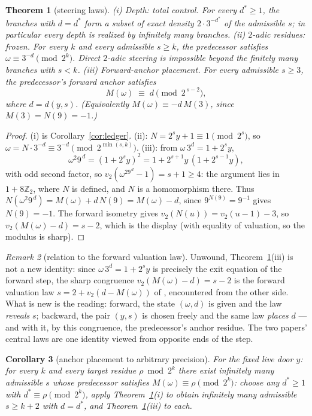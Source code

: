\documentclass[11pt]{article}
\newtheorem{theorem}{Theorem}[section]
\newtheorem{corollary}[theorem]{Corollary}
\theoremstyle{remark}
\newtheorem{remark}[theorem]{Remark}
\newcommand{\Z}{\mathbb{Z}}
\newcommand{\vt}[1]{v_2\!\left(#1\right)}
\newcommand{\w}{\omega}
\begin{document}
\begin{theorem}[steering laws]\label{thm:steer}
(i) \emph{Depth: total control.} For every $d^* \ge 1$, the branches with $d = d^*$ form a subset of exact density $2\cdot3^{-d^*}$ of the admissible $s$; in particular every depth is realized by infinitely many branches.
(ii) \emph{$2$-adic residues: frozen.} For every $k$ and every admissible $s \ge k$, the predecessor satisfies $\w \equiv 3^{-d} \pmod{2^{k}}$. Direct $2$-adic steering is impossible beyond the finitely many branches with $s < k$.
(iii) \emph{Forward-anchor placement.} For every admissible $s \ge 3$, the predecessor's forward anchor satisfies
\[ M(\w) \;\equiv\; d \pmod{2^{\,s-2}}, \]
where $d = d(y,s)$. (Equivalently $M(\w) \equiv -d\,M(3)$, since $M(3) = N(9) = -1$.)
\end{theorem}

\begin{proof}
(i) is Corollary~\ref{cor:ledger}. (ii): $N = 2^s y + 1 \equiv 1 \pmod{2^s}$, so $\w = N\cdot3^{-d} \equiv 3^{-d} \pmod{2^{\min(s,k)}}$. (iii): from $\w\,3^d = 1 + 2^s y$,
\[ \w^2 9^{\,d} = (1 + 2^s y)^2 = 1 + 2^{s+1}y\,(1 + 2^{s-1}y), \]
with odd second factor, so $\vt{\w^29^{\,d} - 1} = s + 1 \ge 4$: the argument lies in $1 + 8\Z_2$, where $N$ is defined, and $N$ is a homomorphism there. Thus $N(\w^2 9^{\,d}) = M(\w) + d\,N(9) = M(\w) - d$, since $9^{N(9)} = 9^{-1}$ gives $N(9) = -1$. The forward isometry gives $\vt{N(u)} = \vt{u - 1} - 3$, so $\vt{M(\w) - d} = s - 2$, which is the display (with equality of valuation, so the modulus is sharp).
\end{proof}

\begin{remark}[relation to the forward valuation law]\label{rem:samelaw}
Unwound, Theorem~\ref{thm:steer}(iii) is not a new identity: since $\w\,3^d = 1 + 2^s y$ is precisely the exit equation of the forward step, the sharp congruence $\vt{M(\w) - d} = s - 2$ is the forward valuation law $s = 2 + \vt{d - M(\w)}$ of \cite{paper1}, encountered from the other side. What is new is the reading: forward, the state $(\w, d)$ is given and the law \emph{reveals} $s$; backward, the pair $(y, s)$ is chosen freely and the same law \emph{places} $d$ --- and with it, by this congruence, the predecessor's anchor residue. The two papers' central laws are one identity viewed from opposite ends of the step.
\end{remark}

\begin{corollary}[anchor placement to arbitrary precision]\label{cor:place}
For the fixed live door $y$: for every $k$ and every target residue $\rho \bmod 2^k$ there exist infinitely many admissible $s$ whose predecessor satisfies $M(\w) \equiv \rho \pmod{2^k}$: choose any $d^* \ge 1$ with $d^* \equiv \rho \pmod{2^k}$, apply Theorem~\ref{thm:steer}(i) to obtain infinitely many admissible $s \ge k + 2$ with $d = d^*$, and Theorem~\ref{thm:steer}(iii) to each.
\end{corollary}
\end{document}
